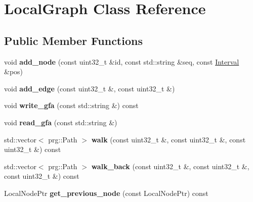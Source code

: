 \hypertarget{classLocalGraph}{}\section{Local\+Graph Class Reference}
\label{classLocalGraph}
\subsection*{Public Member Functions}
\begin{DoxyCompactItemize}
\item 
\mbox{\label{classLocalGraph_a1fbbb66429c6c1b7adcfef5cbf73a488}} 
void {\bfseries add\+\_\+node} (const uint32\+\_\+t \&id, const std\+::string \&seq, const \hyperlink{structInterval}{Interval} \&pos)
\item 
\mbox{\label{classLocalGraph_a9cdd85a9f81a4346b606f2a0f23ab0a2}} 
void {\bfseries add\+\_\+edge} (const uint32\+\_\+t \&, const uint32\+\_\+t \&)
\item 
\mbox{\label{classLocalGraph_a0f9f895c24cb2b71dc5da7816c4e55af}} 
void {\bfseries write\+\_\+gfa} (const std\+::string \&) const
\item 
\mbox{\label{classLocalGraph_a1ad3d6e1b1da65555e922e5a9dd472ff}} 
void {\bfseries read\+\_\+gfa} (const std\+::string \&)
\item 
\mbox{\label{classLocalGraph_aa3a85a696ad54760d30a849053fa21dc}} 
std\+::vector$<$ prg\+::\+Path $>$ {\bfseries walk} (const uint32\+\_\+t \&, const uint32\+\_\+t \&, const uint32\+\_\+t \&) const
\item 
\mbox{\label{classLocalGraph_aabb55905f4041942bc7e60c7fed87f99}} 
std\+::vector$<$ prg\+::\+Path $>$ {\bfseries walk\+\_\+back} (const uint32\+\_\+t \&, const uint32\+\_\+t \&, const uint32\+\_\+t \&) const
\item 
\mbox{\label{classLocalGraph_ab50f8489497bdf56da35b8c45e1e4d75}} 
Local\+Node\+Ptr {\bfseries get\+\_\+previous\+\_\+node} (const Local\+Node\+Ptr) const
\item 
\mbox{\label{classLocalGraph_ab899c2564f5ec23df75a2e765ff3845d}} 

\end{DoxyCompactItemize}
